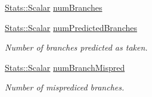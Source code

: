 \begin{Indent}{\bf }\par
{\em \label{_amgrpd41d8cd98f00b204e9800998ecf8427e}
 }\begin{DoxyCompactItemize}
\item 
\hyperlink{classStats_1_1Scalar}{Stats::Scalar} \hyperlink{classBaseSimpleCPU_ac68cca0050062403dbc960ab2a97157a}{numBranches}
\item 
\hyperlink{classStats_1_1Scalar}{Stats::Scalar} \hyperlink{classBaseSimpleCPU_a5c4fac7ec4f7ba3135b78424a9500b2a}{numPredictedBranches}
\begin{DoxyCompactList}\small\item\em Number of branches predicted as taken. \item\end{DoxyCompactList}\item 
\hyperlink{classStats_1_1Scalar}{Stats::Scalar} \hyperlink{classBaseSimpleCPU_af91f54462991887406de8312ee71ba69}{numBranchMispred}
\begin{DoxyCompactList}\small\item\em Number of misprediced branches. \item\end{DoxyCompactList}\end{DoxyCompactItemize}
\end{Indent}
